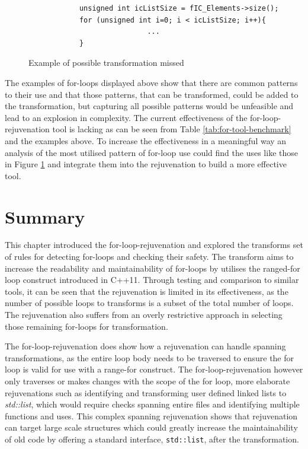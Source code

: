 \documentclass[bsc,frontabs,singlespacing,twoside,parskip,deptreport]{infthesis}
\begin{document}
\begin{figure}[H]
    \centering
    \begin{verbatim}
            unsigned int icListSize = fIC_Elements->size();
            for (unsigned int i=0; i < icListSize; i++){ 
                            ... 
            }
    \end{verbatim}
    \caption{Example of possible transformation missed}
    \label{fig:no-rejuv-indirect-var}
\end{figure}

The examples of for-loops displayed above show that there are common patterns to their use and that those patterns, that can be transformed, could be added to the transformation, but capturing all possible patterns would be unfeasible and lead to an explosion in complexity. The current effectiveness of the for-loop-rejuvenation tool is lacking as can be seen from Table \ref{tab:for-tool-benchmark} and the examples above. To increase the effectiveness in a meaningful way an analysis of the most utilised pattern of for-loop use could find the uses like those in Figure \ref{fig:no-rejuv-indirect-var} and integrate them into the rejuvenation to build a more effective tool.

\section{Summary}
This chapter introduced the for-loop-rejuvenation and explored the transforms set of rules for detecting for-loops and checking their safety. The transform aims to increase the readability and maintainability of for-loops by utilises the ranged-for loop construct introduced in C++11. Through testing and comparison to similar tools, it can be seen that the rejuvenation is limited in its effectiveness, as the number of possible loops to transforms is a subset of the total number of loops. The rejuvenation also suffers from an overly restrictive approach in selecting those remaining for-loops for transformation.

The for-loop-rejuvenation does show how a rejuvenation can handle spanning transformations, as the entire loop body needs to be traversed to ensure the for loop is valid for use with a range-for construct. The for-loop-rejuvenation however only traverses or makes changes with the scope of the for loop, more elaborate rejuvenations such as identifying and transforming user defined linked lists to\textit{ std::list}, which would require checks spanning entire files and identifying multiple functions and uses. This complex spanning rejuvenation shows that rejuvenation can target large scale structures which could greatly increase the maintainability of old code by offering a standard interface, \texttt{std::list}, after the transformation.
\end{document}
